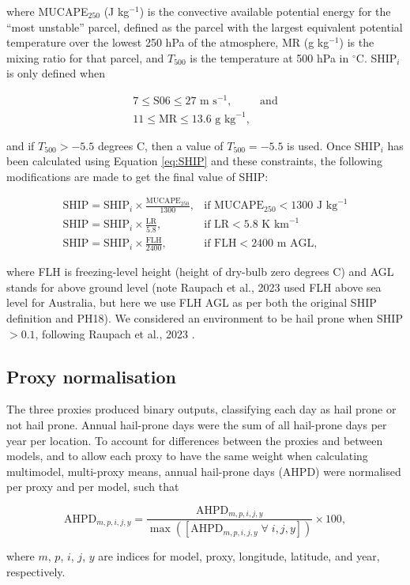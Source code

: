 \documentclass[pdflatex, sn-nature]{sn-jnl}\usepackage[]{graphicx}\usepackage[]{xcolor}
\newcommand{\degr}{$^{\circ{}}$C}
\begin{document}
where MUCAPE$_{250}$ (J kg$^{-1}$) is the convective available potential energy
for the ``most unstable'' parcel, defined as the parcel with the largest
equivalent potential temperature over the lowest 250 hPa of the atmosphere, MR
(g kg$^{-1}$) is the mixing ratio for that parcel, and $T_{500}$ is the
temperature at 500 hPa in \degr{}. SHIP$_i$ is only defined when 

\begin{eqnarray}
7 \leq \textrm{S06} \leq 27 \textrm{ m s}^{-1}, & \textrm{and} \\
11 \leq \textrm{MR} \leq 13.6 \textrm{ g kg}^{-1}, &
\end{eqnarray}

and if $T_{500} > -5.5$ degrees C, then a value of $T_{500} = -5.5$ is used.
Once SHIP$_i$ has been calculated using Equation \ref{eq:SHIP} and these
constraints, the following modifications are made to get the final value of
SHIP:

\begin{eqnarray}
\textrm{SHIP} = \textrm{SHIP}_i \times \frac{\textrm{MUCAPE}_{250}}{1300}, & \textrm{if MUCAPE}_{250} < 1300 \textrm{ J kg}^{-1} \\ 
\textrm{SHIP} = \textrm{SHIP}_i \times \frac{\textrm{LR}}{5.8}, & \textrm{if LR} < 5.8 \textrm{ K km}^{-1} \\
\textrm{SHIP} = \textrm{SHIP}_i \times \frac{\textrm{FLH}}{2400}, & \textrm{if FLH} < 2400 \textrm{ m AGL},
\end{eqnarray}

where FLH is freezing-level height (height of dry-bulb zero degrees C) and AGL
stands for above ground level (note Raupach et al., 2023 \cite{Raupach_MWR_2023}
used FLH above sea level for Australia, but here we use FLH AGL as per both the
original SHIP definition and PH18). We considered an environment to be hail
prone when SHIP $> 0.1$, following Raupach et al., 2023 \cite{Raupach_MWR_2023}.

\subsection{Proxy normalisation}
\label{sec:proxy-normalisation}

The three proxies produced binary outputs, classifying each day as hail prone or
not hail prone. Annual hail-prone days were the sum of all hail-prone days per
year per location. To account for differences between the proxies and between
models, and to allow each proxy to have the same weight when calculating
multimodel, multi-proxy means, annual hail-prone days (AHPD) were normalised per
proxy and per model, such that

\begin{equation}
\textrm{AHPD}_{m,p,i,j,y} = \frac{\textrm{AHPD}_{m,p,i,j,y}}{\max\left([\textrm{AHPD}_{m,p,i,j,y}\;\forall\; i, j, y]\right)} \times 100,
\end{equation}

\noindent where $m$, $p$, $i$, $j$, $y$ are indices for model, proxy, longitude,
latitude, and year, respectively.

\FloatBarrier
\footnotesize


\end{document}
